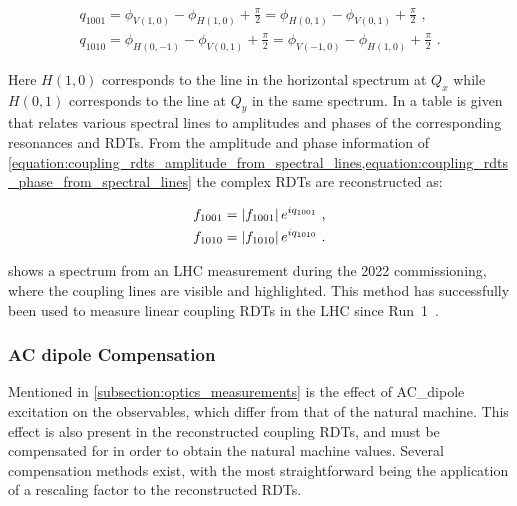\begin{equation}
  \begin{gathered}
    q_{1001} = \phi_{V(1,0)} -\phi_{H(1,0)} +\frac{\pi}{2} = \phi_{H(0,1)} - \phi_{V(0,1)} + \frac{\pi}{2}      \text{ ,}  \\
    q_{1010} = \phi_{H(0,-1)} -\phi_{V(0,1)} +\frac{\pi}{2} = \phi_{V(-1,0)} - \phi_{H(1,0)} + \frac{\pi}{2}    \text{ .}
  \end{gathered}
  \label{equation:coupling_rdts_phase_from_spectral_lines}
\end{equation}

Here \(H(1,0)\) corresponds to the line in the horizontal spectrum at \(Q_x\) while \(H(0, 1)\) corresponds to the line at \(Q_y\) in the same spectrum.
In \cite{PRAB:Franchi:First_Simultaneous} a table is given that relates various spectral lines to amplitudes and phases of the corresponding resonances and RDTs.
From the amplitude and phase information of \cref{equation:coupling_rdts_amplitude_from_spectral_lines,equation:coupling_rdts_phase_from_spectral_lines} the complex RDTs are reconstructed as:

\begin{equation}
  \begin{aligned}
    f_{1001} &= \left\lvert f_{1001} \right\rvert e^{i q_{1001}}  \text{ ,}  \\
    f_{1010} &= \left\lvert f_{1010} \right\rvert e^{i q_{1010}}  \text{ .}  \\
  \end{aligned}
  \label{equation:complex_coupling_rdts_from_phase_and_amplitude}
\end{equation}

 shows a spectrum from an LHC measurement during the \num{2022} commissioning, where the coupling lines are visible and highlighted.
This method has successfully been used to measure linear coupling RDTs in the LHC since Run~\num{1}~\cite{PRAB:Benedikt:Driving_Term_Experiments_CERN,IPAC:Persson:Automatic_Coupling_Correction_LHC_Injection_Oscillations,IPAC:Miyamoto:Measurement_Coupling_RDTs_LHC_AC_Dipole}.

\subsubsection*{AC dipole Compensation}

Mentioned in \cref{subsection:optics_measurements} is the effect of \gls{AC_dipole} excitation on the observables, which differ from that of the natural machine.
This effect is also present in the reconstructed coupling \glspl{RDT}, and must be compensated for in order to obtain the natural machine values.
Several compensation methods exist, with the most straightforward being the application of a rescaling factor to the reconstructed \glspl{RDT}.

